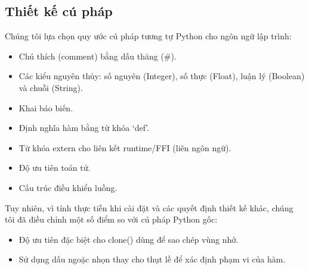 \documentclass[a4paper]{article}
\begin{document}
	
	\subsection{Thiết kế cú pháp}
	
	Chúng tôi lựa chọn quy ước cú pháp tương tự Python cho ngôn ngữ lập trình:
	\begin{itemize}
		\item Chú thích (comment) bằng dấu thăng (\#).
		\item Các kiểu nguyên thủy: số nguyên (Integer), số thực (Float), luận lý (Boolean) và chuỗi (String).
		\item Khai báo biến.
		\item Định nghĩa hàm bằng từ khóa `def'.
		\item Từ khóa extern cho liên kết runtime/FFI (liên ngôn ngữ).
		\item Độ ưu tiên toán tử.
		\item Cấu trúc điều khiển luồng.
	\end{itemize}
	Tuy nhiên, vì tính thực tiễn khi cài đặt và các quyết định thiết kế khác, chúng tôi đã điều chỉnh một số điểm so với cú pháp Python gốc:
	\begin{itemize}
		\item Độ ưu tiên đặc biệt cho clone() dùng để sao chép vùng nhớ.
		\item Sử dụng dấu ngoặc nhọn thay cho thụt lề để xác định phạm vi của hàm.
	\end{itemize}
	
\end{document}
